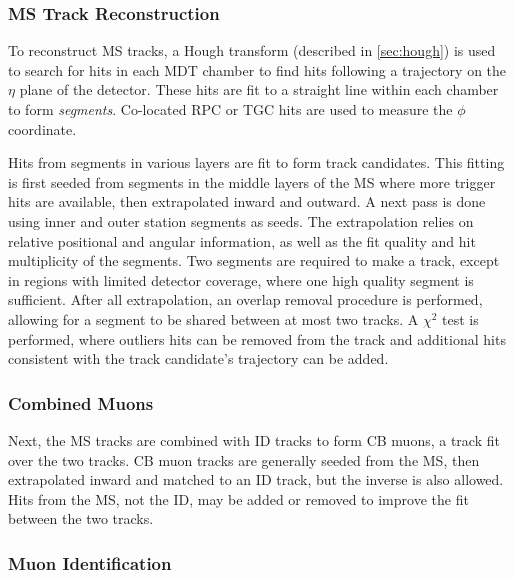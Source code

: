 \subsubsection{MS Track Reconstruction}
To reconstruct \ac{MS} tracks, a Hough transform (described in \autoref{sec:hough}) is used to search for hits in each \ac{MDT} chamber to find hits following a trajectory on the $\eta$ plane of the detector. These hits are fit to a straight line within each chamber to form \emph{segments}. Co-located \ac{RPC} or \ac{TGC} hits are used to measure the $\phi$ coordinate. 

Hits from segments in various layers are fit to form track candidates. This fitting is first seeded from segments in the middle layers of the \ac{MS} where more trigger hits are available, then extrapolated inward and outward. A next pass is done using inner and outer station segments as seeds. The extrapolation relies on relative positional and angular information, as well as the fit quality and hit multiplicity of the segments. Two segments are required to make a track, except in regions with limited detector coverage, where one high quality segment is sufficient. After all extrapolation, an overlap removal procedure is performed, allowing for a segment to be shared between at most two tracks. A $\chi^{2}$ test is performed, where outliers hits can be removed from the track and additional hits consistent with the track candidate's trajectory can be added.



\subsubsection{Combined Muons}
Next, the \ac{MS} tracks are combined with \ac{ID} tracks to form \ac{CB} muons, a track fit over the two tracks. \ac{CB} muon tracks are generally seeded from the \ac{MS}, then extrapolated inward and matched to an \ac{ID} track, but the inverse is also allowed. Hits from the \ac{MS}, not the \ac{ID}, may be added or removed to improve the fit between the two tracks.



\subsubsection{Muon Identification}

